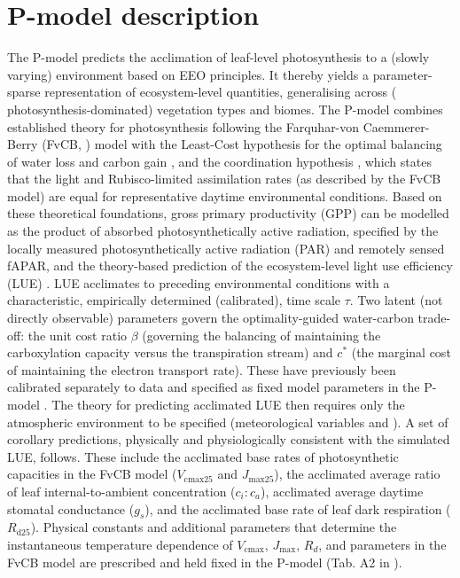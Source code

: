 \documentclass[gmd, manuscript]{copernicus}
\begin{document}
\section{P-model description}

The P-model predicts the acclimation of leaf-level photosynthesis to a (slowly varying) environment based on EEO principles. It thereby yields a parameter-sparse representation of ecosystem-level quantities, generalising across ( photosynthesis-dominated) vegetation types and biomes. The P-model combines established theory for  photosynthesis following the Farquhar-von Caemmerer-Berry (FvCB, \citep{farquhar1980}) model with the Least-Cost hypothesis for the optimal balancing of water loss and carbon gain \citep{prentice2014}, and the coordination hypothesis \citep{wang2017}, which states that the light and Rubisco-limited assimilation rates (as described by the FvCB model) are equal for representative daytime environmental conditions. Based on these theoretical foundations, gross primary productivity (GPP) can be modelled as the product of absorbed photosynthetically active radiation, specified by the locally measured photosynthetically active radiation (PAR) and remotely sensed fAPAR, and the theory-based prediction of the ecosystem-level light use efficiency (LUE) \citep{stocker2020, wang2017}. LUE acclimates to preceding environmental conditions with a characteristic, empirically determined (calibrated), time scale $\tau$. Two latent (not directly observable) parameters govern the optimality-guided water-carbon trade-off: the unit cost ratio $\beta$ (governing the balancing of maintaining the carboxylation capacity versus the transpiration stream) and $c^*$ (the marginal cost of maintaining the electron transport rate). These have previously been calibrated separately to data and specified as fixed model parameters in the P-model \citep{stocker2020, wang2017}. The theory for predicting acclimated LUE then requires only the atmospheric environment to be specified (meteorological variables and ). A set of corollary predictions, physically and physiologically consistent with the simulated LUE, follows. These include the acclimated base rates of photosynthetic capacities in the FvCB model ($V_{\mathrm{cmax25}}$ and $J_{\mathrm{max25}}$), the acclimated average ratio of leaf internal-to-ambient  concentration ($c_i:c_a$), acclimated average daytime stomatal conductance ($g_s$), and the acclimated base rate of leaf dark respiration ($R_{\mathrm{d25}}$). Physical constants and additional parameters that determine the instantaneous temperature dependence of $V_{\mathrm{cmax}}$, $J_{\mathrm{max}}$, $R_d$, and parameters in the FvCB model are prescribed and held fixed in the P-model (Tab. A2 in \citep{stocker2020}).
\end{document}
